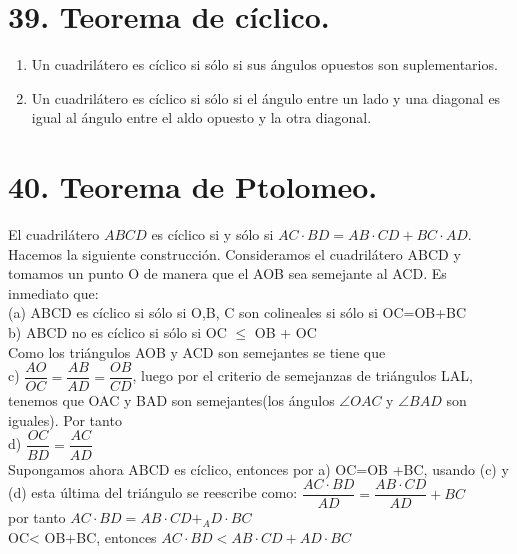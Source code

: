 \documentclass[12pt,a4paper, oneside]{book}
\begin{document}
\section{39. Teorema de cíclico.}
\begin{enumerate}
\item Un cuadrilátero es cíclico si sólo si sus ángulos opuestos son suplementarios.
\item Un cuadrilátero es cíclico si sólo si el ángulo entre un lado y una diagonal es igual al ángulo entre el aldo opuesto y la otra diagonal.
\end{enumerate}
\section{40. Teorema de Ptolomeo.}
El cuadrilátero $ABCD$ es cíclico si y sólo si $AC \cdot BD = AB \cdot CD + BC \cdot AD$.
\\
Hacemos  la siguiente construcción. Consideramos el cuadrilátero ABCD y tomamos un punto O de manera que el AOB sea semejante al ACD. Es inmediato que: 
\\(a) ABCD es cíclico si sólo si O,B, C son colineales si sólo si OC=OB+BC
\\b) ABCD no es cíclico si sólo si OC $\leq$ OB + OC
\\Como los triángulos AOB y ACD son semejantes se tiene que 
\\c) $\dfrac{AO}{OC}=\dfrac{AB}{AD}=\dfrac{OB}{CD}$, luego por el criterio de semejanzas de triángulos LAL, tenemos que OAC y BAD son semejantes(los ángulos $\angle OAC$ y $\angle BAD$ son iguales). Por tanto
\\d) $\dfrac{OC}{BD}=\dfrac{AC}{AD}$
\\Supongamos ahora ABCD es cíclico, entonces por a) OC=OB +BC, usando (c) y (d) esta última del triángulo se reescribe como:
$\dfrac{AC \cdot BD}{AD}=\dfrac{AB \cdot CD}{AD}+BC$
\\por tanto $AC \cdot BD= AB \cdot CD +_ AD \cdot BC$
\\OC< OB+BC, entonces $AC \cdot BD < AB \cdot CD + AD \cdot BC$
\end{document}
